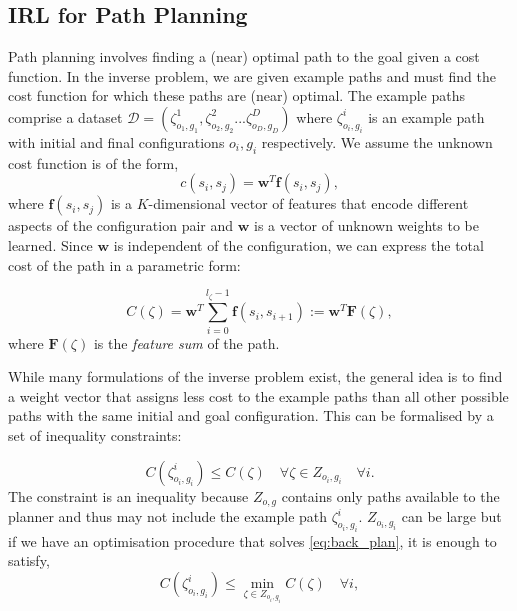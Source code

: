 \documentclass{article}  %
\begin{document}


\subsection{IRL for Path Planning \label{subsec:inverse_problem}}
Path planning involves finding a (near) optimal path to the goal given a cost function. In the inverse problem, we are given example paths and must find the cost function for which these paths are (near) optimal.  The example paths comprise a dataset $\mathcal{D} = (\zeta^1_{o_1,g_1},\zeta^2_{o_2,g_2}...\zeta^D_{o_D,g_D})$ where $\zeta^i_{o_i,g_i}$ is an example path with initial and final configurations $o_i,g_i$ respectively. We assume the unknown cost function is of the form,
\begin{equation}
	c(s_i,s_j) = \mathbf{w}^T \mathbf{f}(s_i,s_j), \label{eq:inner_prod}
\end{equation}
where $\mathbf{f}(s_i,s_j)$ is a $K$-dimensional vector of features that encode different aspects of the configuration pair and $\mathbf{w}$ is a vector of unknown weights to be learned. Since $\mathbf{w}$ is independent of the configuration, we can express the total cost of the path in a parametric form:

\begin{equation}
	C(\zeta) = \mathbf{w}^T\sum_{i=0}^{l_{\zeta}-1} \mathbf{f}(s_i,s_{i+1}) := \mathbf{w}^T \mathbf{F}(\zeta),
\end{equation}
where $\mathbf{F}(\zeta)$ is the \emph{feature sum} of the path.

While many formulations of the inverse problem exist, the general idea is to find a weight vector that assigns less cost to the example paths than all other possible paths with the same initial and goal configuration.  This can be formalised by a set of inequality constraints:

\begin{equation}
	C(\zeta^i_{o_i,g_i}) \leq  C(\zeta) \quad \forall \zeta \in Z_{o_i,g_i}  \quad \forall i. \label{eq:const1}
\end{equation}
The constraint is an inequality because $Z_{o,g}$ contains only paths available to the planner and thus may not include the example path $\zeta^i_{o_i,g_i}$.
$Z_{o_i,g_i}$ can be large but if we have an optimisation procedure that solves \eqref{eq:back_plan}, it is enough to satisfy, 
\begin{equation}
	C(\zeta^i_{o_i,g_i}) \leq \min_{\zeta \in Z_{o_i,g_i}} C(\zeta) \quad \forall i, \label{eq:const}
\end{equation}
\end{document}
